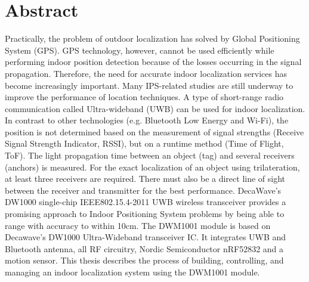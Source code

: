 \documentclass[\main/main.tex]{subfiles}
\begin{document}
\graphicspath{{imgs/}{00_misc/imgs/}}

\chapter*{Abstract}

Practically, the problem of outdoor localization has solved by  Global Positioning System (GPS).  GPS technology, however, cannot be used efficiently while performing indoor position detection  because of the losses occurring in the signal propagation. Therefore, the need for accurate indoor localization services has become increasingly important. Many IPS-related studies are still underway to improve the performance of location techniques.
\newline\newline
A type of short-range radio communication called Ultra-wideband (UWB) can be used for indoor localization. In contrast to other technologies (e.g. Bluetooth Low Energy and Wi-Fi), the position is not determined based on the measurement of signal strengths (Receive Signal Strength Indicator, RSSI), but on a runtime method (Time of Flight, ToF). The light propagation time between an object (tag) and several receivers (anchors) is measured. For the exact localization of an object using trilateration, at least three receivers are required. There must also be a direct line of sight between the receiver and transmitter for the best performance.
\newline\newline
DecaWave's DW1000 single-chip IEEE802.15.4-2011 UWB wireless transceiver provides a promising approach to Indoor Positioning System problems by being able to range with accuracy to within 10cm. The DWM1001 module is based on Decawave's DW1000 Ultra-Wideband transceiver IC. It integrates UWB and Bluetooth antenna, all RF circuitry, Nordic Semiconductor nRF52832 and a motion sensor. This thesis describes the process of building, controlling, and managing an indoor localization system using the DWM1001 module.
\end{document}
